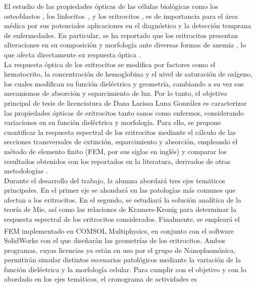 \documentclass[11pt,letterpaper]{article}
\begin{document}
	El estudio de las propiedades ópticas de las células biológicas como los osteoblastos \cite{antunesOpticalPropertiesBone2019}, los linfocitos~\cite{yoonIdentificationNonactivatedLymphocytes2017}, y los eritrocitos \cite{bosschaartLiteratureReviewNovel2014}, es de importancia para el área médica por sus potenciales aplicaciones en el diagnóstico y la detección temprana de enfermedades.  En particular, se ha reportado que los eritrocitos presentan alteraciones en su composición y morfología ante diversas formas de anemia \cite{bosschaartLiteratureReviewNovel2014}, lo que afecta directamente su respuesta óptica \cite{wriedtLightScatteringSingle2006,meinkeOpticalPropertiesPlatelets2007}.\\
	
	La respuesta óptica de los eritrocitos se modifica por factores como el hematocrito, la concentración de hemoglobina y el nivel de saturación de oxígeno, los cuales modifican su función dieléctrica y geometría, cambiando a su vez sus mecanismos de absorción y esparcimiento de luz. Por lo tanto, el objetivo principal de tesis de licenciatura de Dana Larissa Luna González es caracterizar las propiedades ópticas de eritrocitos tanto sanos como enfermos, considerando variaciones en su función dieléctrica y morfología. Para ello, se propone cuantificar la respuesta espectral de los eritrocitos mediante el cálculo de las secciones transversales de extinción, esparcimiento y absorción, empleando el método de elemento finito (FEM, por sus siglas en inglés) y comparar los resultados obtenidos con los reportados en la literatura, derivados de otras metodologías \cite{ergulComputationalStudyScattering2010,wriedtLightScatteringSingle2006}.\\
	
	Durante el desarrollo del trabajo, la alumna abordará tres ejes temáticos principales. En el primer eje se ahondará en las patologías más comunes que afectan a los eritrocitos. En el segundo, se estudiará la solución analítica de la teoría de Mie, así como las relaciones de Kramers-Kronig \cite{lucariniKramersKronigRelationsOptical2005} para determinar la respuesta espectral de los eritrocitos considerados. Finalmente, se empleará el FEM implementado en COMSOL Multiphysics\textsuperscript{\texttrademark}, en conjunto con el software SolidWorks con el que diseñarán las geometrías de los eritrocitos.  Ambos programas, cuyas licencias ya están en uso por el grupo de Nanoplasmónica, permitirán simular distintos escenarios patológicos mediante la variación de la función dieléctrica y la morfología celular. Para cumplir con el objetivo y con lo abordado en  los ejes temáticos, el cronograma de actividades es
	
\end{document}
